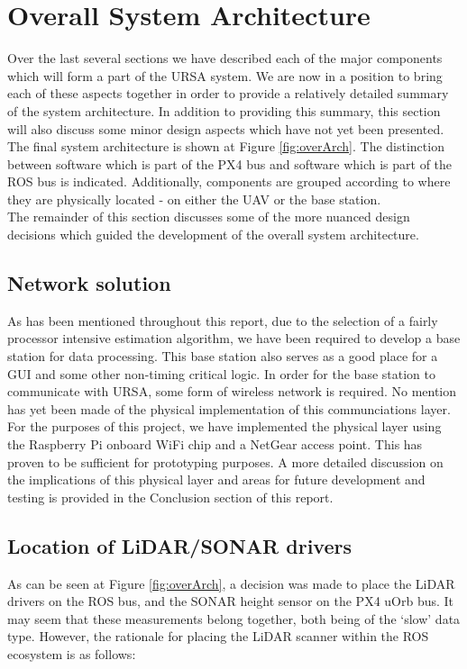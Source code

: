 \documentclass[capstone_report.tex]{subfiles}
\begin{document}
\section{Overall System Architecture}
Over the last several sections we have described each of the major components which will form a part of the URSA system. We are now in a position to bring each of these aspects together in order to provide a relatively detailed summary of the system architecture. In addition to providing this summary, this section will also discuss some minor design aspects which have not yet been presented. The final system architecture is shown at Figure \ref{fig:overArch}. The distinction between software which is part of the PX4 bus and software which is part of the ROS bus is indicated. Additionally, components are grouped according to where they are physically located - on either the UAV or the base station. \\

The remainder of this section discusses some of the more nuanced design decisions which guided the development of the overall system architecture.

\subsection{Network solution}
As has been mentioned throughout this report, due to the selection of a fairly processor intensive estimation algorithm, we have been required to develop a base station for data processing. This base station also serves as a good place for a GUI and some other non-timing critical logic. In order for the base station to communicate with URSA, some form of wireless network is required. No mention has yet been made of the physical implementation of this communciations layer.\\


For the purposes of this project, we have implemented the physical layer using the Raspberry Pi onboard WiFi chip and a NetGear access point. This has proven to be sufficient for prototyping purposes. A more detailed discussion on the implications of this physical layer and areas for future development and testing is provided in the Conclusion section of this report.


\subsection{Location of LiDAR/SONAR drivers}
As can be seen at Figure \ref{fig:overArch}, a decision was made to place the LiDAR drivers on the ROS bus, and the SONAR height sensor on the PX4 uOrb bus. It may seem that these measurements belong together, both being of the `slow' data type. However, the rationale for placing the LiDAR scanner within the ROS ecosystem is as follows:
\end{document}
